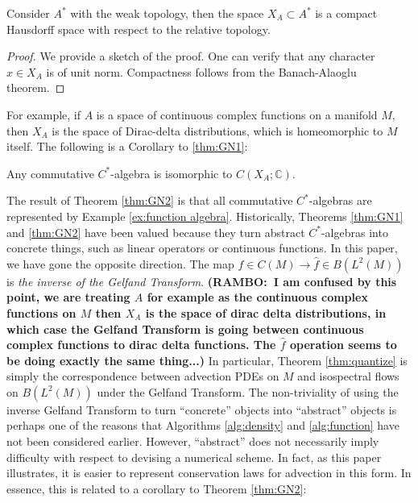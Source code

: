 \documentclass[final,leqno]{siamltex1213}
\newcommand{\ram}[1]{{\normalsize{\textbf{({\color{red}RAMBO:\ }#1)}}}}
\begin{document}
\begin{proposition}
	Consider $A^{*}$ with the weak topology, then the space $X_{A} \subset A^{*}$ is a compact Hausdorff space with respect to the relative topology.
\end{proposition}
\begin{proof}
	We provide a sketch of the proof.
	One can verify that any character $x \in X_{A}$ is of unit norm.
	Compactness follows from the Banach-Alaoglu theorem.
\end{proof}

For example, if $A$ is a space of continuous complex functions on a manifold $M$, then $X_{A}$ is the space of Dirac-delta distributions, which is homeomorphic to $M$ itself.
The following is a Corollary to \ref{thm:GN1}:

\begin{theorem} \label{thm:GN2}
	Any commutative $C^{*}$-algebra is isomorphic to $C(X_{A} ; \mathbb{C})$.
\end{theorem}

The result of Theorem \ref{thm:GN2} is that all commutative $C^{*}$-algebras are represented by Example \ref{ex:function algebra}.
Historically, Theorems \ref{thm:GN1} and \ref{thm:GN2} have been valued because they turn abstract $C^{*}$-algebras into concrete things, such as linear operators or continuous functions.
In this paper, we have gone the opposite direction.
The map $f \in C(M) \to \hat{f} \in B( L^{2}(M) )$ is \emph{the inverse of the Gelfand Transform}. 
\ram{I am confused by this point, we are treating $A$ for example as the continuous complex functions on $M$ then $X_{A}$ is the space of dirac delta distributions, in which case the Gelfand Transform is going between continuous complex functions to dirac delta functions. The $\hat{f}$ operation seems to be doing exactly the same thing...}
In particular, Theorem \ref{thm:quantize} is simply the correspondence between advection PDEs on $M$ and isospectral flows on $B(L^{2}(M))$ under the Gelfand Transform.
The non-triviality of using the inverse Gelfand Transform to turn ``concrete'' objects into ``abstract'' objects is perhaps one of the reasons that Algorithms \ref{alg:density} and \ref{alg:function} have not been considered earlier.
However, ``abstract'' does not necessarily imply difficulty with respect to devising a numerical scheme.
In fact, as this paper illustrates, it is easier to represent conservation laws for advection in this form.
In essence, this is related to a corollary to Theorem \ref{thm:GN2}:
\end{document}
